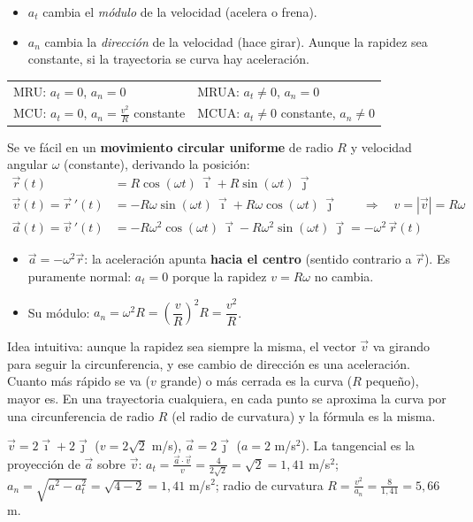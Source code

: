 \documentclass[11pt,a4paper]{article}
\newcommand{\ii}{\vec{\imath}}
\newcommand{\jj}{\vec{\jmath}}
\begin{document}
\begin{itemize}[itemsep=1pt]
  \item $a_t$ cambia el \emph{módulo} de la velocidad (acelera o frena).
  \item $a_n$ cambia la \emph{dirección} de la velocidad (hace girar). Aunque la rapidez sea constante, si la trayectoria se curva hay aceleración.
\end{itemize}
\begin{tabular}{@{}ll@{}}
MRU: $a_t=0$, $a_n=0$ & MRUA: $a_t\neq0$, $a_n=0$\\
MCU: $a_t=0$, $a_n=\frac{v^2}{R}$ constante & MCUA: $a_t\neq0$ constante, $a_n\neq0$
\end{tabular}

\begin{clave}[title={¿De dónde sale $a_n=v^2/R$?}]
Se ve fácil en un \textbf{movimiento circular uniforme} de radio $R$ y velocidad angular $\omega$ (constante), derivando la posición:
\begin{align*}
\vec r(t)&=R\cos(\omega t)\,\ii+R\sin(\omega t)\,\jj\\
\vec v(t)=\vec r\,'(t)&=-R\omega\sin(\omega t)\,\ii+R\omega\cos(\omega t)\,\jj\qquad\Rightarrow\quad v=|\vec v|=R\omega\\
\vec a(t)=\vec v\,'(t)&=-R\omega^2\cos(\omega t)\,\ii-R\omega^2\sin(\omega t)\,\jj=-\omega^2\,\vec r(t)
\end{align*}
\begin{itemize}[itemsep=1pt]
  \item $\vec a=-\omega^2\vec r$: la aceleración apunta \textbf{hacia el centro} (sentido contrario a $\vec r$). Es puramente normal: $a_t=0$ porque la rapidez $v=R\omega$ no cambia.
  \item Su módulo: $a_n=\omega^2R=\left(\dfrac vR\right)^2R=\dfrac{v^2}{R}$.
\end{itemize}
Idea intuitiva: aunque la rapidez sea siempre la misma, el vector $\vec v$ va girando para seguir la circunferencia, y ese cambio de dirección es una aceleración. Cuanto más rápido se va ($v$ grande) o más cerrada es la curva ($R$ pequeño), mayor es. En una trayectoria cualquiera, en cada punto se aproxima la curva por una circunferencia de radio $R$ (el radio de curvatura) y la fórmula es la misma.
\end{clave}

\begin{ejemplo}[title={Ejemplo (continuación): en $t=1$ s}]
$\vec v=2\ii+2\jj$ ($v=2\sqrt2$ m/s), $\vec a=2\jj$ ($a=2$ m/s$^2$). La tangencial es la proyección de $\vec a$ sobre $\vec v$:
$a_t=\frac{\vec a\cdot\vec v}{v}=\frac{4}{2\sqrt2}=\sqrt2=1{,}41$ m/s$^2$; \ $a_n=\sqrt{a^2-a_t^2}=\sqrt{4-2}=1{,}41$ m/s$^2$; radio de curvatura $R=\frac{v^2}{a_n}=\frac{8}{1{,}41}=5{,}66$ m.
\end{ejemplo}
\end{document}
